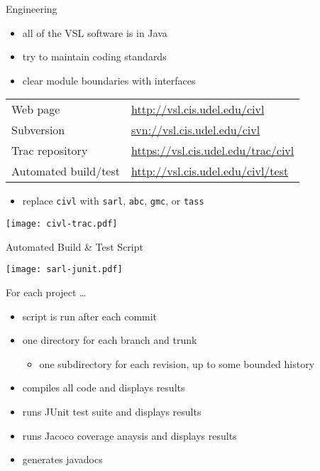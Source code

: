\documentclass[t]{beamer}
\begin{document}
\begin{frame}{Engineering}

  \begin{itemize}
  \item all of the VSL software is in Java
  \item try to maintain coding standards
  \item clear module boundaries with interfaces
  \end{itemize}
  
  
  \begin{center}
    \begin{tabular}{|ll|}
      \hline
      Web page & \url{http://vsl.cis.udel.edu/civl}\\
      Subversion & \url{svn://vsl.cis.udel.edu/civl}\\
      Trac repository & \url{https://vsl.cis.udel.edu/trac/civl}\\
      Automated build/test & \url{http://vsl.cis.udel.edu/civl/test}\\
      \hline
    \end{tabular}
  \end{center}

  \begin{itemize}
  \item replace \texttt{civl} with \texttt{sarl}, \texttt{abc}, \texttt{gmc}, or
    \texttt{tass}
  \end{itemize}

  \texttt{[image: civl-trac.pdf]}

\end{frame}

\begin{frame}{Automated Build \& Test Script}

  \begin{center}
    \texttt{[image: sarl-junit.pdf]}
  \end{center}

  For each project \ldots
  \begin{itemize}
  \item script is run after each commit
  \item one directory for each \alert{branch} and \alert{trunk}
    \begin{itemize}
    \item one subdirectory for each revision, up to some bounded history
    \end{itemize}
  \item compiles all code and displays results
  \item runs JUnit test suite and displays results
  \item runs Jacoco coverage anaysis and displays results
  \item generates javadocs
  \end{itemize}
\end{frame}
\end{document}
